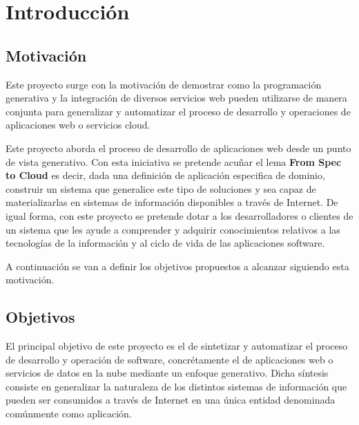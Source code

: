 \documentclass[a4paper,11pt]{book}
\begin{document}


\newpage

\newpage

\tableofcontents
\listoffigures



%

%



\chapter{Introducción}

\section{Motivación}

Este proyecto surge con la motivación de demostrar como la programación generativa y  la integración de diversos servicios web pueden utilizarse de manera conjunta para generalizar y automatizar el proceso de desarrollo y operaciones de aplicaciones web o servicios cloud.

Este proyecto aborda el proceso de desarrollo de aplicaciones web desde un punto de vista generativo.  Con esta iniciativa se pretende acuñar el lema \textbf{From Spec to Cloud} es decir, dada una definición de aplicación especifica de dominio, construir un sistema que generalice este tipo de soluciones y sea capaz de materializarlas en sistemas de información disponibles a través de Internet. De igual forma, con este proyecto se pretende dotar a los desarrolladores o clientes de un sistema que les ayude a comprender y adquirir conocimientos relativos a las tecnologías de la información y al ciclo de vida de las aplicaciones software.

A continuación se van a definir los objetivos propuestos a alcanzar siguiendo esta motivación.

\section{Objetivos}

El principal objetivo de este proyecto es el de sintetizar y automatizar el proceso de desarrollo y operación de software, concrétamente el de aplicaciones web o servicios de datos en la nube mediante un enfoque generativo. Dicha síntesis consiste en generalizar la naturaleza de los distintos sistemas de información que pueden ser consumidos a través de Internet en una única entidad denominada comúnmente como aplicación.
\end{document}
